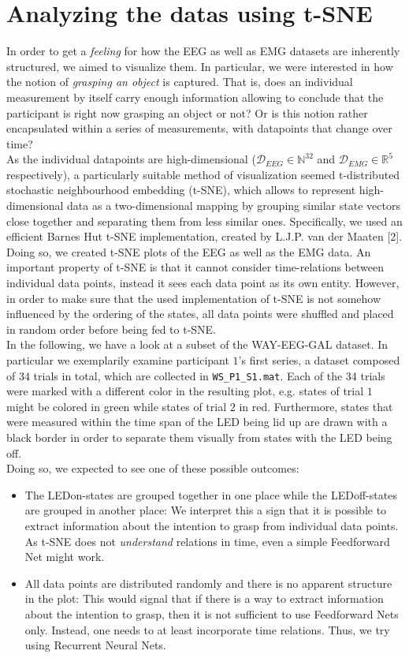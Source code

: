 \documentclass{article} %
\begin{document}
\section{Analyzing the datas using t-SNE}
In order to get a \emph{feeling} for how the EEG as well as EMG datasets are inherently structured, we aimed to visualize them. In particular, we were interested in how the notion of \emph{grasping an object} is captured. That is, does an individual measurement by itself carry enough information allowing to conclude that the participant is right now grasping an object or not? Or is this notion rather encapsulated within a series of measurements, with datapoints that change over time?\\
As the individual datapoints are high-dimensional ($\mathcal{D}_{EEG} \in \mathbb{N}^{32}$ and $\mathcal{D}_{EMG} \in \mathbb{R}^5$ respectively), a particularly suitable method of visualization seemed t-distributed stochastic neighbourhood embedding (t-SNE), which allows to represent high-dimensional data as a two-dimensional mapping by grouping similar state vectors close together and separating them from less similar ones. Specifically, we used an efficient Barnes Hut t-SNE implementation, created by L.J.P. van der Maaten [2]. Doing so, we created t-SNE plots of the EEG as well as the EMG data. An important property of t-SNE is that it cannot consider time-relations between individual data points, instead it sees each data point as its own entity. However, in order to make sure that the used implementation of t-SNE is not somehow influenced by the ordering of the states, all data points were shuffled and placed in random order before being fed to t-SNE.\\
In the following, we have a look at a subset of the WAY-EEG-GAL dataset. In particular we exemplarily examine participant $1$'s first series, a dataset composed of $34$ trials in total, which are collected in \verb|WS_P1_S1.mat|. Each of the 34 trials were marked with a different color in the resulting plot, e.g. states of trial $1$ might be colored in green while states of trial $2$ in red. Furthermore, states that were measured within the time span of the LED being lid up are drawn with a black border in order to separate them visually from states with the LED being off.\\
Doing so, we expected to see one of these possible outcomes:
\begin{itemize}
	\item The LEDon-states are grouped together in one place while the LEDoff-states are grouped in another place:
	We interpret this a sign that it is possible to extract information about the intention to grasp from individual data points. As t-SNE does not \emph{understand} relations in time, even a simple Feedforward Net might work.
	\item All data points are distributed randomly and there is no apparent structure in the plot:
	This would signal that if there is a way to extract information about the intention to grasp, then it is not sufficient to use Feedforward Nets only. Instead, one needs to at least incorporate time relations. Thus, we try using Recurrent Neural Nets.
\end{itemize}
\end{document}
